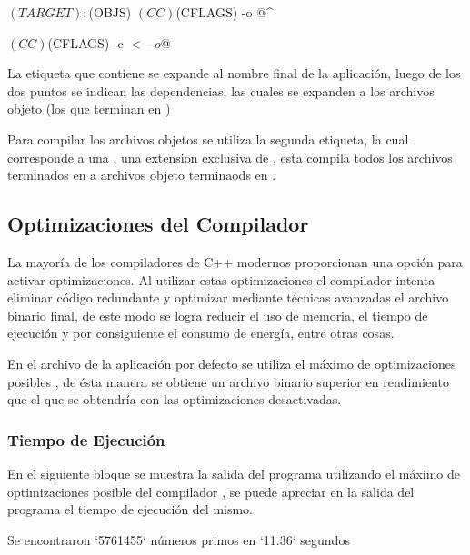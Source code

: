 \documentclass[12pt]{article}
\newenvironment{fullgrayverb}
{\verbbox}
{\endverbbox\par\colorbox{gray!25}{\parbox{\textwidth}{\theverbbox}}\par}
\begin{document}
\begin{fullgrayverb}[\mbox{}]
$(TARGET): $(OBJS)
    $(CC) $(CFLAGS) -o $@ $^

    $(CC) $(CFLAGS) -c $< -o $@
\end{fullgrayverb}

La etiqueta que contiene  se expande al nombre final de la
aplicación, luego de los dos puntos se indican las dependencias, las cuales se
expanden a los archivos objeto (los que terminan en )

Para compilar los archivos objetos se utiliza la segunda etiqueta, la cual
corresponde a una , una extension exclusiva de , 
esta  compila todos los archivos terminados en  a
archivos objeto terminaods en .

\subsection{Optimizaciones del Compilador}

La mayoría de los compiladores de C++ modernos proporcionan una opción para
activar optimizaciones. Al utilizar estas optimizaciones el compilador
intenta eliminar código redundante y optimizar mediante técnicas avanzadas el
archivo binario final, de este modo se logra reducir el uso de memoria, el
tiempo de ejecución y por consiguiente el consumo de energía, entre otras cosas.

En el archivo  de la aplicación por defecto se utiliza el máximo
de optimizaciones posibles , de ésta manera se obtiene un archivo
binario superior en rendimiento que el que se obtendría con las optimizaciones
desactivadas.


\subsubsection{Tiempo de Ejecución}

En el siguiente bloque se muestra la salida del programa utilizando el máximo de
optimizaciones posible del compilador , se puede apreciar en la salida
del programa el tiempo de ejecución del mismo.

\begin{fullgrayverb}
Se encontraron `5761455` números primos en `11.36` segundos
\end{fullgrayverb}
\end{document}
